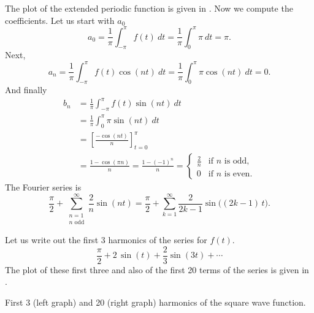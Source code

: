 \begin{example}
The plot of the extended periodic function is given in
.
Now we compute the coefficients.  Let us start with $a_0$
\begin{equation*}
a_0 = \frac{1}{\pi} \int_{-\pi}^\pi f(t) ~dt
= \frac{1}{\pi} \int_{0}^\pi \pi ~dt = \pi .
\end{equation*}
Next,
\begin{equation*}
a_n = \frac{1}{\pi} \int_{-\pi}^\pi f(t) \cos (nt) ~dt 
= \frac{1}{\pi} \int_{0}^\pi \pi \cos (nt) ~dt = 0 .
\end{equation*}
And finally
\begin{equation*}
\begin{split}
b_n & = \frac{1}{\pi} \int_{-\pi}^\pi f(t) \sin (nt) ~dt \\
& = \frac{1}{\pi} \int_{0}^\pi \pi \sin (nt) ~dt \\
& = \left[ \frac{- \cos (nt)}{n} \right]_{t=0}^\pi \\
& = \frac{1 - \cos (\pi n)}{n}
= \frac{1 - {(-1)}^n}{n}
=
\begin{cases}
\frac{2}{n} & \text{if } n \text{ is odd} , \\
0 & \text{if } n \text{ is even} .
\end{cases}
\end{split}
\end{equation*}
The Fourier series is
\begin{equation*}
\frac{\pi}{2} +  \sum_{\substack{n=1\\n \text{ odd}}}^\infty
\frac{2}{n} 
\sin (n t)
=
\frac{\pi}{2} + \sum_{k=1}^\infty
\frac{2}{2k-1} 
\sin \bigl( (2k-1)\, t \bigr) .
\end{equation*}

Let us write out the first 3 harmonics of the series for $f(t)$.
\begin{equation*}
\frac{\pi}{2}
+
2 \, \sin (t)
+
\frac{2}{3}  \sin (3t)
+ \cdots
\end{equation*}
The plot of these first three and also of the first 20 terms of the series
is given in
.

\begin{myfig}
\capstart
\caption{First 3 (left graph) and 20 (right graph) harmonics of the
square wave function.\label{ts:squarewavefsfig}}
\end{myfig}
\end{example}

